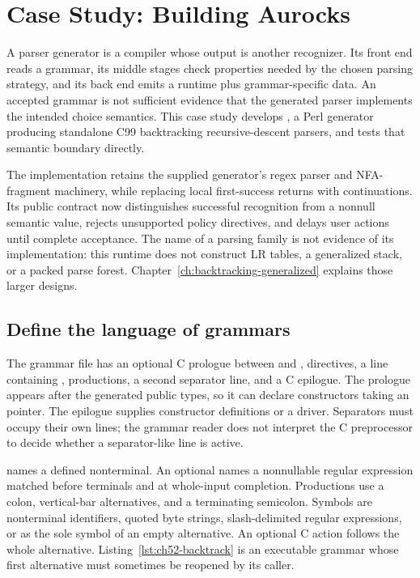 \chapter{Case Study: Building Aurocks}
\label{ch:aurocks-case-study}

A parser generator is a compiler whose output is another recognizer.
Its front end reads a grammar, its middle stages check properties needed by the chosen parsing strategy, and its back end emits a runtime plus grammar-specific data.
An accepted grammar is not sufficient evidence that the generated parser implements the intended choice semantics.
This case study develops , a Perl generator producing standalone C99 backtracking recursive-descent parsers, and tests that semantic boundary directly.

The implementation retains the supplied generator's regex parser and NFA-fragment machinery, while replacing local first-success returns with continuations.
Its public contract now distinguishes successful recognition from a nonnull semantic value, rejects unsupported policy directives, and delays user actions until complete acceptance.
The name of a parsing family is not evidence of its implementation: this runtime does not construct LR tables, a generalized stack, or a packed parse forest.
Chapter~\ref{ch:backtracking-generalized} explains those larger designs.

\section{Define the language of grammars}
\label{sec:ch52-grammar-language}

The grammar file has an optional C prologue between \code{\%\{} and \code{\%\}}, directives, a line containing \code{\%\%}, productions, a second separator line, and a C epilogue.
The prologue appears after the generated public types, so it can declare constructors taking an  pointer.
The epilogue supplies constructor definitions or a driver.
Separators must occupy their own lines; the grammar reader does not interpret the C preprocessor to decide whether a separator-like line is active.

 names a defined nonterminal.
An optional  names a nonnullable regular expression matched before terminals and at whole-input completion.
Productions use a colon, vertical-bar alternatives, and a terminating semicolon.
Symbols are nonterminal identifiers, quoted byte strings, slash-delimited regular expressions, or  as the sole symbol of an empty alternative.
An optional C action follows the whole alternative.
Listing~\ref{lst:ch52-backtrack} is an executable grammar whose first alternative must sometimes be reopened by its caller.

